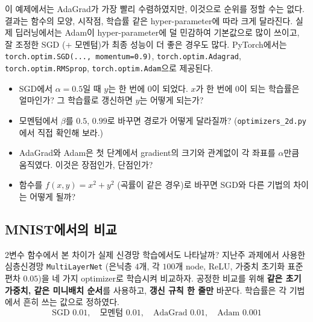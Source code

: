 \documentclass[11pt,a4paper]{article}
\begin{document}
\begin{remarkbox}
이 예제에서는 AdaGrad가 가장 빨리 수렴하였지만, 이것으로 순위를 정할 수는 없다.
결과는 함수의 모양, 시작점, 학습률 같은 hyper-parameter에 따라 크게 달라진다.
실제 딥러닝에서는 Adam이 hyper-parameter에 덜 민감하여 기본값으로 많이 쓰이고,
잘 조정한 SGD (+ 모멘텀)가 최종 성능이 더 좋은 경우도 많다.
PyTorch에서는 \texttt{torch.optim.SGD(..., momentum=0.9)}, \texttt{torch.optim.Adagrad},
\texttt{torch.optim.RMSprop}, \texttt{torch.optim.Adam}으로 제공된다.
\end{remarkbox}

\begin{thinkbox}[생각해 보자]
\begin{itemize}[leftmargin=1.5em]
\item SGD에서 $\alpha=0.5$일 때 $y$는 한 번에 $0$이 되었다. $x$가 한 번에 $0$이 되는 학습률은 얼마인가?
그 학습률로 갱신하면 $y$는 어떻게 되는가?
\item 모멘텀에서 $\beta$를 $0.5$, $0.99$로 바꾸면 경로가 어떻게 달라질까?
(\texttt{optimizers\_2d.py}에서 직접 확인해 보라.)
\item AdaGrad와 Adam은 첫 단계에서 gradient의 크기와 관계없이 각 좌표를 $\alpha$만큼 움직였다.
이것은 장점인가, 단점인가?
\item 함수를 $f(x,y)=x^2+y^2$ (곡률이 같은 경우)로 바꾸면 SGD와 다른 기법의 차이는 어떻게 될까?
\end{itemize}
\end{thinkbox}

\subsection{MNIST에서의 비교}\label{sec:mnistopt}

2변수 함수에서 본 차이가 실제 신경망 학습에서도 나타날까?
지난주 과제에서 사용한 심층신경망 \texttt{MultiLayerNet}
(은닉층 $4$개, 각 $100$개 node, ReLU, 가중치 초기화 표준편차 $0.05$)을
네 가지 optimizer로 학습시켜 비교하자.
공정한 비교를 위해 \textbf{같은 초기 가중치, 같은 미니배치 순서}를 사용하고,
\textbf{갱신 규칙 한 줄만} 바꾼다.
학습률은 각 기법에서 흔히 쓰는 값으로 정하였다.
\[
\text{SGD }0.01,\quad \text{모멘텀 }0.01,\quad \text{AdaGrad }0.01,\quad \text{Adam }0.001
\]
\end{document}
